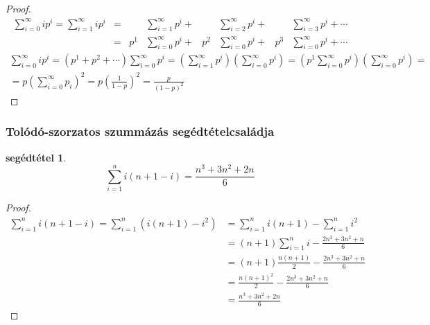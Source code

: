 \documentclass{article}
\newtheorem{lemm}{segédtétel}
\newcommand{\parenthesed}[1]{\left(#1\right)}
\begin{document}
\begin{proof}
		\begin{align}
			\sum_{i=0}^\infty ip^i = \sum_{i=1}^\infty ip^i &= &    &\sum_{i=1}^\infty p^i + {} &    &\sum_{i=2}^\infty p^i + {} &    &\sum_{i=3}^\infty p^i + \cdots\\
					                                &= & p^1&\sum_{i=0}^\infty p^i + {} & p^2&\sum_{i=0}^\infty p^i + {} & p^3&\sum_{i=0}^\infty p^i + \cdots
		\end{align}
		\begin{multline}
			\sum_{i=0}^\infty ip^i = \parenthesed{p^1 + p^2 + \cdots}\sum_{i=0}^\infty p^i = \parenthesed{\sum_{i=1}^\infty p^i} \parenthesed{\sum_{i=0}^\infty p^i} = \parenthesed{p^1\sum_{i=0}^\infty p^i} \parenthesed{\sum_{i=0}^\infty p^i}=\\
			= p\parenthesed{\sum_{i=0}^\infty p_i}^2 = p\parenthesed{\frac1{1-p}}^2 = \frac p{\parenthesed{1-p}^2}
		\end{multline}
	\end{proof}

	\subsubsection{Tolódó-szorzatos szummázás segédtételcsaládja}

	\begin{lemm}
		\[\sum_{i=1}^n i\parenthesed{n+1-i} = \frac{n^3+3n^2+2n}{6}\]
	\end{lemm}
	\begin{proof}
		\begin{align}
			\sum_{i=1}^n i\parenthesed{n+1-i} = \sum_{i=1}^n\parenthesed{i\parenthesed{n+1} - i^2} &= \sum_{i=1}^n i\parenthesed{n+1} - \sum_{i=1}^n i^2\\
			                                                                                       &= \parenthesed{n+1}\sum_{i=1}^n i - \frac{2n^3+3n^2+n}{6}\\
			                                                                                       &= \parenthesed{n+1}\frac{n\parenthesed{n+1}}2 - \frac{2n^3+3n^2+n}{6}\\
			                                                                                       &= \frac{n\parenthesed{n+1}^2}2 - \frac{2n^3+3n^2+n}{6}\\
			                                                                                       &= \frac{n^3+3n^2+2n}{6}
		\end{align}
	\end{proof}
\end{document}
